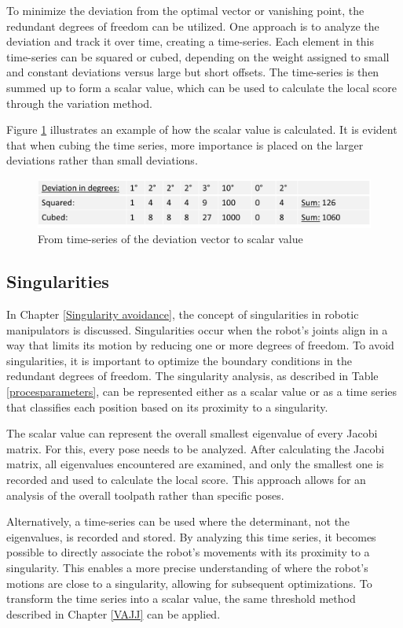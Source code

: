 To minimize the deviation from the optimal vector or vanishing point, the redundant degrees of freedom can be utilized. One approach is to analyze the deviation and track it over time, creating a time-series. Each element in this time-series can be squared or cubed, depending on the weight assigned to small and constant deviations versus large but short offsets. The time-series is then summed up to form a scalar value, which can be used to calculate the local score through the variation method.


Figure \ref{deviation} illustrates an example of how the scalar value is calculated. It is evident that when cubing the time series, more importance is placed on the larger deviations rather than small deviations.


\begin{figure}[H]
	\centerline{\includegraphics[width=.9\textwidth]{figures/devi.png}}
	\caption{From time-series of the deviation vector to scalar value}
	\label{deviation}
\end{figure}
 

\subsection{Singularities}

In Chapter \ref{Singularity avoidance}, the concept of singularities in robotic manipulators is discussed. Singularities occur when the robot's joints align in a way that limits its motion by reducing one or more degrees of freedom. To avoid singularities, it is important to optimize the boundary conditions in the redundant degrees of freedom. The singularity analysis, as described in Table \ref{procesparameters}, can be represented either as a scalar value or as a time series that classifies each position based on its proximity to a singularity.

The scalar value can represent the overall smallest eigenvalue of every Jacobi matrix. For this, every pose needs to be analyzed. After calculating the Jacobi matrix, all eigenvalues encountered are examined, and only the smallest one is recorded and used to calculate the local score. This approach allows for an analysis of the overall toolpath rather than specific poses.

Alternatively, a time-series can be used where the determinant, not the eigenvalues, is recorded and stored. By analyzing this time series, it becomes possible to directly associate the robot's movements with its proximity to a singularity. This enables a more precise understanding of where the robot's motions are close to a singularity, allowing for subsequent optimizations. To transform the time series into a scalar value, the same threshold method described in Chapter \ref{VAJJ} can be applied.
  
